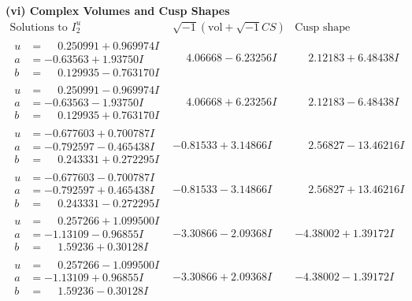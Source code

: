 \documentclass[1p]{elsarticle_modified}
\theoremstyle{definition}
\newcommand{\I}{\sqrt{-1}}
\begin{document}
\newpage\flushleft \textbf{(vi) Complex Volumes and Cusp Shapes}
$$\begin{array}{c|c|c}  
\text{Solutions to }I^u_{2}& \I (\text{vol} + \sqrt{-1}CS) & \text{Cusp shape}\\
 \hline 
\begin{aligned}
u &= \phantom{-}0.250991 + 0.969974 I \\
a &= -0.63563 + 1.93750 I \\
b &= \phantom{-}0.129935 - 0.763170 I\end{aligned}
 & \phantom{-}4.06668 - 6.23256 I & \phantom{-}2.12183 + 6.48438 I \\ \hline\begin{aligned}
u &= \phantom{-}0.250991 - 0.969974 I \\
a &= -0.63563 - 1.93750 I \\
b &= \phantom{-}0.129935 + 0.763170 I\end{aligned}
 & \phantom{-}4.06668 + 6.23256 I & \phantom{-}2.12183 - 6.48438 I \\ \hline\begin{aligned}
u &= -0.677603 + 0.700787 I \\
a &= -0.792597 - 0.465438 I \\
b &= \phantom{-}0.243331 + 0.272295 I\end{aligned}
 & -0.81533 + 3.14866 I & \phantom{-}2.56827 - 13.46216 I \\ \hline\begin{aligned}
u &= -0.677603 - 0.700787 I \\
a &= -0.792597 + 0.465438 I \\
b &= \phantom{-}0.243331 - 0.272295 I\end{aligned}
 & -0.81533 - 3.14866 I & \phantom{-}2.56827 + 13.46216 I \\ \hline\begin{aligned}
u &= \phantom{-}0.257266 + 1.099500 I \\
a &= -1.13109 - 0.96855 I \\
b &= \phantom{-}1.59236 + 0.30128 I\end{aligned}
 & -3.30866 - 2.09368 I & -4.38002 + 1.39172 I \\ \hline\begin{aligned}
u &= \phantom{-}0.257266 - 1.099500 I \\
a &= -1.13109 + 0.96855 I \\
b &= \phantom{-}1.59236 - 0.30128 I\end{aligned}
 & -3.30866 + 2.09368 I & -4.38002 - 1.39172 I \\ \hline\begin{aligned}

\end{aligned}
\end{array}$$
\end{document}
